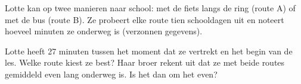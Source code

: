 %


\begin{probleem}
Lotte kan op twee manieren naar school: met de fiets langs de ring (route A) of met de bus (route B). Ze probeert elke route tien schooldagen uit en noteert hoeveel minuten ze onderweg is (verzonnen gegevens).



Lotte heeft 27 minuten tussen het moment dat ze vertrekt en het begin van de les. Welke route kiest ze best? Haar broer rekent uit dat ze met beide routes gemiddeld even lang onderweg is. Is het dan om het even?
\end{probleem}

